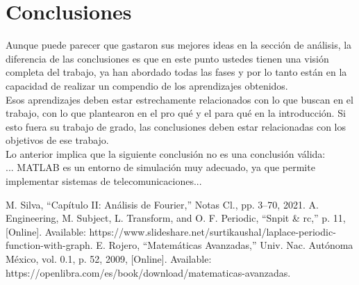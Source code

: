 \documentclass[12pt]{article}
\begin{document}
\section*{Conclusiones}
    Aunque puede parecer que gastaron sus mejores ideas en la sección de análisis, la 
    diferencia de las conclusiones es que en este punto ustedes tienen una visión completa 
    del trabajo, ya han abordado todas las fases y por lo tanto están en la capacidad de 
    realizar un compendio de los aprendizajes obtenidos.\\
    Esos aprendizajes deben estar estrechamente relacionados con lo que buscan en el 
    trabajo, con lo que plantearon en el pro qué y el para qué en la introducción. Si esto fuera 
    su trabajo de grado, las conclusiones deben estar relacionadas con los objetivos de ese 
    trabajo.\\
    Lo anterior implica que la siguiente conclusión no es una conclusión válida:\\
    ... MATLAB es un entorno de simulación muy adecuado, ya que permite implementar 
    sistemas de telecomunicaciones...

\begin{thebibliography}{99}
        M. Silva, “Capítulo II: Análisis de Fourier,” Notas Cl., pp. 3–70, 2021.
        A. Engineering, M. Subject, L. Transform, and O. F. Periodic, “Snpit \& rc,” p. 11, [Online]. Available: https://www.slideshare.net/surtikaushal/laplace-periodic-function-with-graph.
        E. Rojero, “Matemáticas Avanzadas,” Univ. Nac. Autónoma México, vol. 0.1, p. 52, 2009, [Online]. Available: https://openlibra.com/es/book/download/matematicas-avanzadas.
\end{thebibliography}
\end{document}
